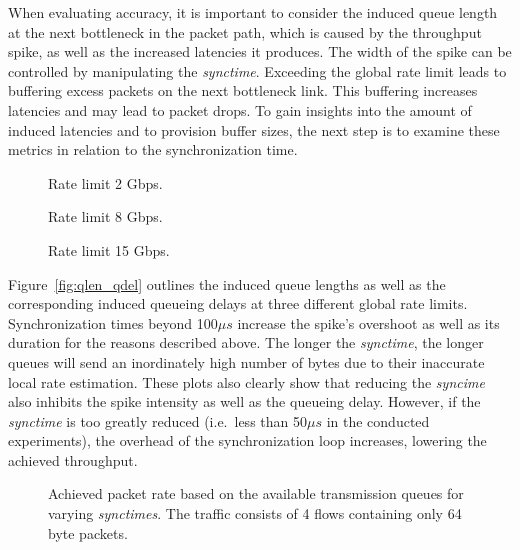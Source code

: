 %
When evaluating accuracy, it is important to consider the induced queue length at the next bottleneck in the packet path, which is caused by the throughput spike, as well as the increased latencies it produces.
%
The width of the spike can be controlled by manipulating the \textit{synctime}.
%
Exceeding the global rate limit leads to buffering excess packets on the next bottleneck link.
%
This buffering increases latencies and may lead to packet drops.
%
To gain insights into the amount of induced latencies and to provision buffer sizes, the next step is to examine these metrics in relation to the synchronization time. 
%
\begin{figure*}
    \begin{subfigure}{0.3\linewidth}
        \centering
        
        \caption{Rate limit 2 Gbps.}\label{fig:qlen_qdel_200us_2}
    \end{subfigure}
    \hfill
    \begin{subfigure}{0.3\linewidth}
        \centering
        
        \caption{Rate limit 8 Gbps.}\label{fig:qlen_qdel_200us_8}
    \end{subfigure}
    \hfill
    \begin{subfigure}{0.3\linewidth}
        \centering
        
        \caption{Rate limit 15 Gbps.}\label{fig:qlen_qdel_200us_15}
    \end{subfigure}
    \caption{Induced queue lengths and delays at varying \textit{synctimes} and at a configured global rate limit of 2, 8, and 15 Gbps}\label{fig:qlen_qdel}
\end{figure*}
Figure~\ref{fig:qlen_qdel} outlines the induced queue lengths as well as the corresponding induced queueing delays at three different global rate limits.
%
Synchronization times beyond 100$\mu s$ increase the spike's overshoot as well as its duration for the reasons described above.
%
The longer the \textit{synctime}, the longer queues will send an inordinately high number of bytes due to their inaccurate local rate estimation.
%
These plots also clearly show that reducing the \textit{syncime} also inhibits the spike intensity as well as the queueing delay.
%
However, if the \textit{synctime} is too greatly reduced (i.e.\ less than 50$\mu s$ in the conducted experiments), the overhead of the synchronization loop increases, lowering the achieved throughput.
%
\begin{figure}[H]
    \centering
    
    \caption{Achieved packet rate based on the available transmission queues for varying \textit{synctimes}. The traffic consists of 4 flows containing only 64 byte packets.}\label{fig:sync_txq_64}
\end{figure}
